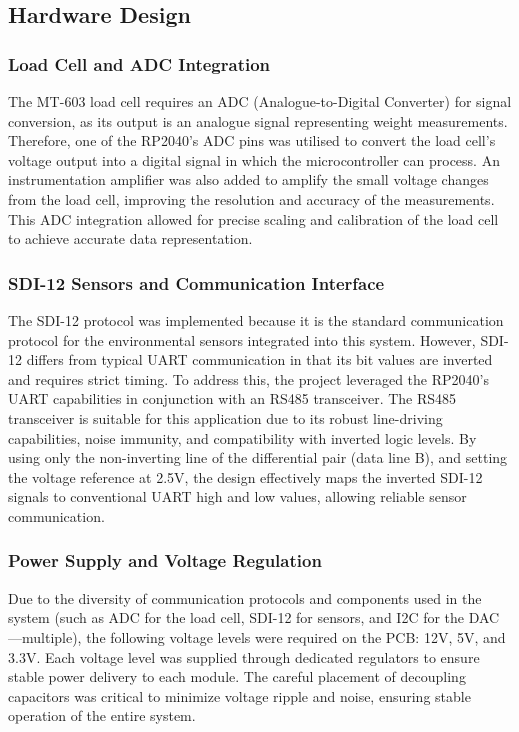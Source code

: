 \subsection{Hardware Design}

\subsubsection{Load Cell and ADC Integration}

The MT-603 load cell requires an ADC (Analogue-to-Digital Converter) for signal conversion, as its output is an analogue 
signal representing weight measurements. Therefore, one of the RP2040's ADC pins was utilised 
to convert the load cell's voltage output into a digital signal in which the microcontroller 
can process. An instrumentation amplifier was also added to amplify the small voltage changes 
from the load cell, improving the resolution and accuracy of the measurements. This ADC 
integration allowed for precise scaling and calibration of the load cell to achieve 
accurate data representation.

\subsubsection{SDI-12 Sensors and Communication Interface} 

The SDI-12 protocol was implemented because 
it is the standard communication protocol for the environmental sensors integrated into 
this system. However, SDI-12 differs from typical UART communication in that its bit 
values are inverted and requires strict timing. To address this, the project leveraged 
the RP2040's UART capabilities in conjunction with an RS485 transceiver. The RS485 
transceiver is suitable for this application due to its robust line-driving capabilities, 
noise immunity, and compatibility with inverted logic levels. By using only the non-inverting 
line of the differential pair (data line B), and setting the voltage reference at 2.5V, the design 
effectively maps the inverted SDI-12 signals to conventional UART high and low values, 
allowing reliable sensor communication.

\subsubsection{Power Supply and Voltage Regulation}

Due to the diversity of communication protocols 
and components used in the system (such as ADC for the load cell, SDI-12 for sensors, and I2C 
for the DAC—multiple), the following voltage levels were required on the PCB: 12V, 5V, and 3.3V. Each voltage 
level was supplied through dedicated regulators to ensure stable power delivery to each module. 
The careful placement of decoupling capacitors was critical to minimize voltage ripple and noise, 
ensuring stable operation of the entire system.

